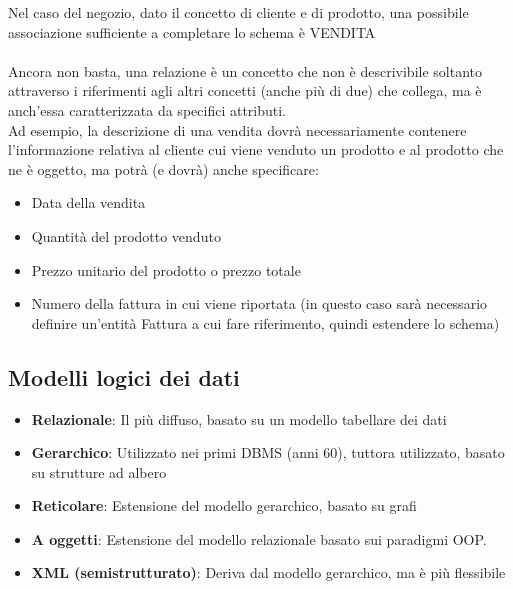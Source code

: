 \documentclass[../main.tex]{subfiles}
\begin{document}
	Nel caso del negozio, dato il concetto di cliente e di prodotto, una possibile associazione sufficiente a completare lo schema è VENDITA \\ \\
	Ancora non basta, una relazione è un concetto che non è descrivibile soltanto attraverso i riferimenti agli altri concetti (anche più di due) che collega, ma è anch’essa caratterizzata da specifici attributi.\\
	Ad esempio, la descrizione di una vendita dovrà necessariamente contenere l’informazione relativa al cliente cui viene venduto un prodotto e al prodotto che ne è oggetto, ma potrà (e dovrà) anche specificare:
	\begin{itemize}
		\item Data della vendita 
		\item Quantità del prodotto venduto 
		\item Prezzo unitario del prodotto o prezzo totale
		\item Numero della fattura in cui viene riportata (in questo caso sarà necessario definire un’entità Fattura a cui fare riferimento, quindi estendere lo schema)
	\end{itemize}
	\subsection{Modelli logici dei dati}
	\begin{itemize}
		\item \textbf{Relazionale}: Il più diffuso, basato su un modello tabellare dei dati
		\item \textbf{Gerarchico}: Utilizzato nei primi DBMS (anni 60), tuttora utilizzato, basato su strutture ad albero
		\item \textbf{Reticolare}: Estensione del modello gerarchico, basato su grafi
		\item \textbf{A oggetti}: Estensione del modello relazionale basato sui paradigmi OOP.
		\item \textbf{XML (semistrutturato)}: Deriva dal modello gerarchico, ma è più flessibile
	\end{itemize}
\end{document}
